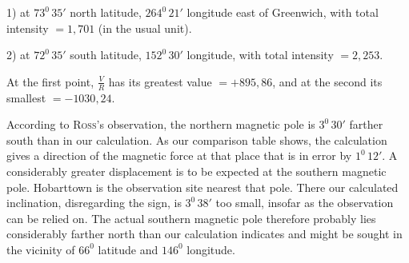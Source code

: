 1) at $73^0\,35'$ north latitude, $264^0\,21'$ longitude east of Greenwich, with total intensity $=1{,}701$ (in the usual unit).

2) at $72^0\,35'$ south latitude, $152^0\,30'$ longitude, with total intensity $=2{,}253$.

At the first point, $\frac VR$ has its greatest value $=+895{,}86$, and at the second its smallest $=-1030{,}24$.

According to \textsc{Ross}'s observation, the northern magnetic pole is $3^0\,30'$ farther south than in our calculation. As our comparison table shows, the calculation gives a direction of the magnetic force at that place that is in error by $1^0\,12'$. A considerably greater displacement is to be expected at the southern magnetic pole. Hobarttown is the observation site nearest that pole. There our calculated inclination, disregarding the sign, is $3^0\,38'$ too small, insofar as the observation can be relied on. The actual southern magnetic pole therefore probably lies considerably farther north than our calculation indicates and might be sought in the vicinity of $66^0$ latitude and $146^0$ longitude.

